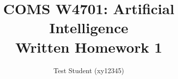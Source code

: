 \documentclass[11pt]{article}
\begin{document}
\title{COMS W4701: Artificial Intelligence\\
       Written Homework 1}
\author{Test Student (xy12345)} %
\maketitle
\end{document}
